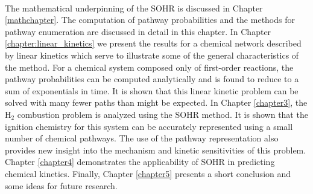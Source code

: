 \paragraph{}
The mathematical underpinning of the SOHR is discussed in Chapter \ref{mathchapter}. The computation
of pathway probabilities and the methods for pathway enumeration are discussed
in detail in this chapter. In Chapter \ref{chapter:linear_kinetics} we present the results for a chemical network
described by linear kinetics which serve to illustrate some of the general characteristics
of the method. For a chemical system composed only of first-order reactions, the pathway
probabilities can be computed analytically and is found to reduce to a sum of
exponentials in time. It is shown that this linear kinetic problem can be solved with
many fewer paths than might be expected. In Chapter \ref{chapter3}, the H$_2$
combustion problem is analyzed using the SOHR method. It is shown that the ignition
chemistry for this system can be accurately represented using a small number of chemical
pathways. The use of the pathway representation also provides new insight into the
mechanism and kinetic sensitivities of this problem. Chapter \ref{chapter4} demonstrates the applicability of SOHR in predicting chemical kinetics. Finally, Chapter \ref{chapter5} presents a short
conclusion and some ideas for future research.

